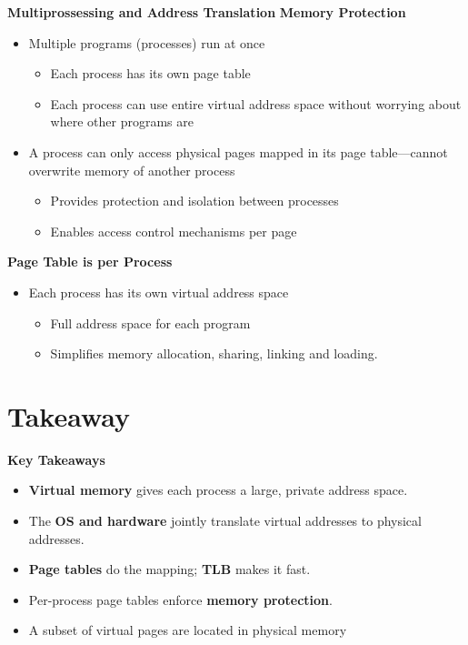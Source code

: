 \documentclass[11pt, table, aspectratio=169]{beamer}
\begin{document}
\begin{frame}[fragile]{\textbf{Multiprossessing and Address Translation}}
	\textbf{Memory Protection}
		\begin{itemize}
			\item Multiple programs (processes) run at once
			\begin{itemize}
				\item Each process has its own page table
				\item Each process can use entire virtual address space without worrying about where other programs are
			\end{itemize}
			\item A process can only access physical pages mapped in its page table---cannot overwrite memory of another process
			\begin{itemize}
				\item Provides protection and isolation between processes
				\item Enables access control mechanisms per page
			\end{itemize}
		\end{itemize}
	
\textbf{Page Table is per Process}\\
		\begin{itemize}
			\item Each process has its own virtual address space
			\begin{itemize}
				\item Full address space for each program
				\item Simplifies memory allocation, sharing, linking and loading. 
			\end{itemize}
		\end{itemize}
\end{frame}
			
\section{\textbf{Takeaway}}

\begin{frame}[fragile]{\textbf{Key Takeaways}}
	\begin{itemize}
		\item \textbf{Virtual memory} gives each process a large, private address space.
		\item The \textbf{OS and hardware} jointly translate virtual addresses to physical addresses.
		\item \textbf{Page tables} do the mapping; \textbf{TLB} makes it fast.
		\item Per-process page tables enforce \textbf{memory protection}.
		\item A subset of virtual pages are located in physical memory
	\end{itemize}
\end{frame}
\end{document}

